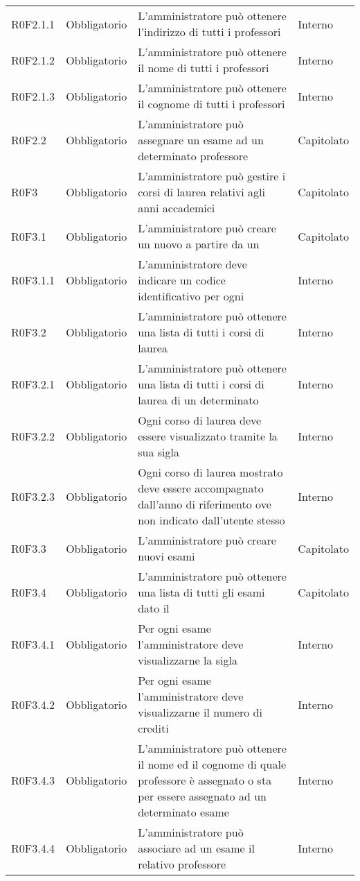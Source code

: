 \documentclass[AnalisiDeiRequisiti.tex]{subfiles}
\begin{document}
\begin{longtable}[H]{p{2.6cm}p{2.5cm}p{5cm}p{2cm}}
	R0F2.1.1 & Obbligatorio & L'amministratore può ottenere l'indirizzo di tutti i professori & Interno \\
	R0F2.1.2 & Obbligatorio & L'amministratore può ottenere il nome di tutti i professori & Interno \\
	R0F2.1.3 & Obbligatorio & L'amministratore può ottenere il cognome di tutti i professori & Interno \\
	R0F2.2 & Obbligatorio & L'amministratore può assegnare un esame ad un determinato professore & Capitolato \\
	R0F3 & Obbligatorio & L'amministratore può gestire i corsi di laurea relativi agli anni accademici & Capitolato \\
	R0F3.1 & Obbligatorio & L'amministratore può creare un nuovo \citGloss{corso di laurea} a partire da un \citGloss{anno accademico} & Capitolato \\ 
	R0F3.1.1 & Obbligatorio & L'amministratore deve indicare un codice identificativo per ogni \citGloss{corso di laurea} & Interno \\
	R0F3.2 & Obbligatorio & L'amministratore può ottenere una lista di tutti i corsi di laurea & Interno \\
	R0F3.2.1 & Obbligatorio & L'amministratore può ottenere una lista di tutti i corsi di laurea di un determinato \citGloss{anno accademico} & Interno \\
	R0F3.2.2 & Obbligatorio & Ogni corso di laurea deve essere visualizzato tramite la sua sigla  & Interno \\
	R0F3.2.3 & Obbligatorio & Ogni corso di laurea mostrato deve essere accompagnato dall'anno di riferimento ove non indicato dall'utente stesso & Interno \\
	R0F3.3 & Obbligatorio & L'amministratore può creare nuovi esami & Capitolato \\ 
	R0F3.4 & Obbligatorio & L'amministratore può ottenere una lista di tutti gli esami dato il \citGloss{corso di laurea} & Capitolato \\
	R0F3.4.1 & Obbligatorio & Per ogni esame l'amministratore deve visualizzarne la sigla & Interno \\
	R0F3.4.2 & Obbligatorio & Per ogni esame l'amministratore deve visualizzarne il numero di crediti & Interno \\
	R0F3.4.3 & Obbligatorio & L'amministratore può ottenere il nome ed il cognome di quale professore è assegnato o sta per essere assegnato ad un determinato esame & Interno \\
	R0F3.4.4  & Obbligatorio & L'amministratore può associare ad un esame il relativo professore & Interno \\

\end{longtable}
\end{document}
